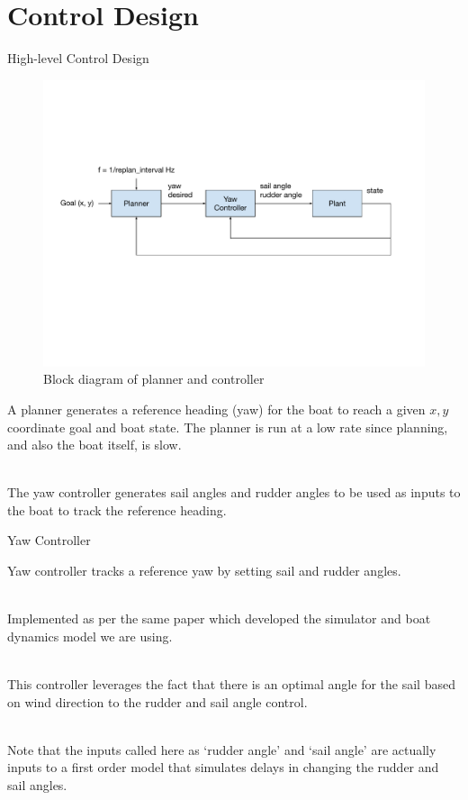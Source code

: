 \documentclass[10pt,xcolor={table,dvipsnames},t]{beamer}
\begin{document}
\section{Control Design}

\begin{frame}{High-level Control Design}

\begin{figure}
    \centering
    \includegraphics[width=\linewidth,trim={1cm 7cm 2cm 5cm},clip]{documents/final_pres_figs/controller_block_diagram.pdf}
    \caption{Block diagram of planner and controller}
    \label{fig:controller_block_diagram}
\end{figure}
    
A planner generates a reference heading (yaw) for the boat to reach a given \(x, y\) coordinate goal
and boat state.
The planner is run at a low rate since planning, and also the boat itself, is slow.

\hfill\\
The yaw controller generates sail angles and rudder angles to be used as inputs to the boat to
track the reference heading.

\end{frame}

\begin{frame}{Yaw Controller}

    Yaw controller tracks a reference yaw by setting sail and rudder angles.

    \hfill\\
    Implemented as per the same paper which developed the simulator and 
    boat dynamics model we are using\cite{Buehler2018}.
    
    \hfill\\
    This controller leverages the fact that there is an optimal angle for the sail based on wind direction to  the rudder and sail angle control.
    
    \hfill\\
    Note that the inputs called here as `rudder angle' and `sail angle' are actually
    inputs to a first order model that simulates delays in changing the rudder and sail angles.
    
\end{frame}
\end{document}
